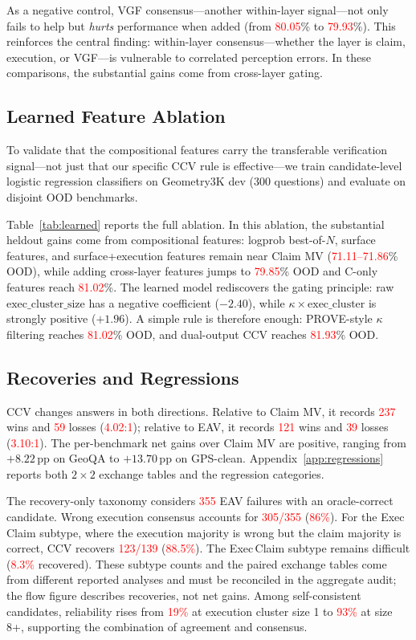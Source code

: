 \documentclass{article}
\newcommand{\ccv}{\textsc{CCV}}
\newcommand{\pp}{\,\text{pp}}
\newcommand{\recheck}[1]{\textcolor{red}{#1}}
\begin{document}
As a negative control, VGF consensus---another within-layer signal---not only fails to help but \emph{hurts} performance when added (from \recheck{80.05}\% to \recheck{79.93}\%). This reinforces the central finding: within-layer consensus---whether the layer is claim, execution, or VGF---is vulnerable to correlated perception errors. In these comparisons, the substantial gains come from cross-layer gating.

\subsection{Learned Feature Ablation}
\label{sec:learned}

To validate that the compositional features carry the transferable verification signal---not just that our specific CCV rule is effective---we train candidate-level logistic regression classifiers on Geometry3K dev (300 questions) and evaluate on disjoint OOD benchmarks.

Table~\ref{tab:learned} reports the full ablation. In this ablation, the substantial heldout gains come from compositional features: logprob best-of-$N$, surface features, and surface+execution features remain near Claim MV (\recheck{71.11--71.86}\% OOD), while adding cross-layer features jumps to \recheck{79.85}\% OOD and C-only features reach \recheck{81.02}\%. The learned model rediscovers the gating principle: raw $\text{exec\_cluster\_size}$ has a negative coefficient ($-2.40$), while $\kappa \times \text{exec\_cluster}$ is strongly positive ($+1.96$). A simple rule is therefore enough: PROVE-style $\kappa$ filtering reaches \recheck{81.02}\% OOD, and dual-output \ccv{} reaches \recheck{81.93}\% OOD.

\subsection{Recoveries and Regressions}
\label{sec:errors}

\ccv{} changes answers in both directions. Relative to Claim MV, it records \recheck{237} wins and \recheck{59} losses (\recheck{4.02:1}); relative to EAV, it records \recheck{121} wins and \recheck{39} losses (\recheck{3.10:1}). The per-benchmark net gains over Claim MV are positive, ranging from $+8.22\pp$ on GeoQA to $+13.70\pp$ on GPS-clean. Appendix~\ref{app:regressions} reports both $2\times2$ exchange tables and the regression categories.

The recovery-only taxonomy considers \recheck{355} EAV failures with an oracle-correct candidate. Wrong execution consensus accounts for \recheck{305/355} (\recheck{86\%}). For the Exec\,Claim subtype, where the execution majority is wrong but the claim majority is correct, \ccv{} recovers \recheck{123/139} (\recheck{88.5\%}). The Exec\,Claim subtype remains difficult (\recheck{8.3\%} recovered). These subtype counts and the paired exchange tables come from different reported analyses and must be reconciled in the aggregate audit; the flow figure describes recoveries, not net gains. Among self-consistent candidates, reliability rises from \recheck{19\%} at execution cluster size 1 to \recheck{93\%} at size 8+, supporting the combination of agreement and consensus.
\end{document}
